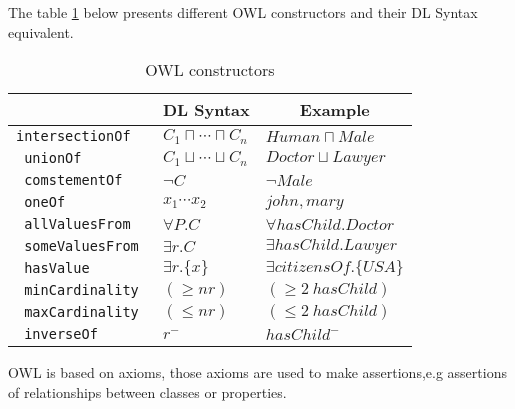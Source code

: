 The table \ref{tab:owlConstructors} \cite{HLP08} below presents different OWL constructors and their DL Syntax equivalent. 

\begin{table}[H]
\centering
\begin{tabular}{ |>{\tt}l|l|l| }
    \hline
    \multicolumn{1}{|c|}{\textbf{Constructor}}  & \multicolumn{1}{c|}{\textbf{DL Syntax}}   & \multicolumn{1}{c|}{\textbf{Example}} \\ \hline
    intersectionOf                              & $C_{1}\sqcap\cdots\sqcap C_{n}$           & $Human \sqcap Male$ \\ \hline
    unionOf                                     & $C_{1}\sqcup\cdots\sqcup C_{n}$           & $\mathit{Doctor} \sqcup \mathit{Lawyer}$ \\ \hline
    comstementOf                                & $\lnot C$                                 & $\lnot \mathit{Male}$ \\ \hline
    oneOf                                       & ${x_{1}\cdots x_{2}}$                     & ${\mathit{john},\mathit{mary}}$ \\ \hline
    allValuesFrom                               & $\forall P.C$                             & $\forall \mathit{hasChild}.\mathit{Doctor}$ \\ \hline
    someValuesFrom                              & $\exists r.C$                             & $\exists \mathit{hasChild}.\mathit{Lawyer}$ \\ \hline
    hasValue                                    & $\exists r.\{x\}$                         & $\exists \mathit{citizensOf}.\{\mathit{USA}\}$ \\ \hline
    minCardinality                              & $(\geq nr)$                               & $(\geq 2~\mathit{hasChild})$ \\ \hline
    maxCardinality                              & $(\leq nr)$                               & $(\leq 2~\mathit{hasChild})$ \\ \hline
    inverseOf                                   & $r^{-}$                                   & $\mathit{hasChild}^{-}$ \\ \hline
\end{tabular}
\caption{OWL constructors}
\label{tab:owlConstructors}
\end{table}

OWL is based on axioms, those axioms are used to make assertions,e.g assertions of relationships between classes or properties.

